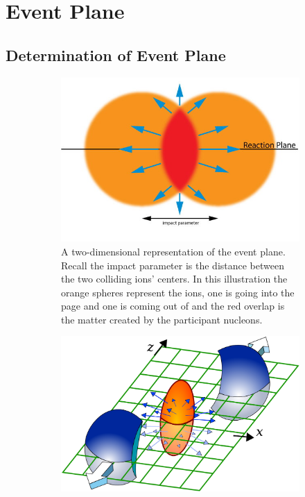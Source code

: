 
\chapter{Event Plane} %

\section{Determination of Event Plane}
\label{sect:eventplane}

\begin{figure}[htbp!]
  \centering
    \begin{subfigure}[p]{0.7\textwidth}
    \includegraphics[width=1\textwidth]{Figures/Flow_Plane.jpg}
    \caption[Diagram showing impact parameter versus $N_spectators$ and $N_participants$]{A two-dimensional representation of the event plane. Recall the impact parameter is the distance between the two colliding ions' centers. In this illustration the orange spheres represent the ions, one is going into the page and one is coming out of and the red overlap is the matter created by the participant nucleons.
    \label{fig:cernfireball}}
    \end{subfigure}
    \begin{subfigure}[p]{0.7\textwidth}
    \includegraphics[width=1\textwidth]{Figures/flowcartoon.jpg}

\end{subfigure}
\end{figure}
